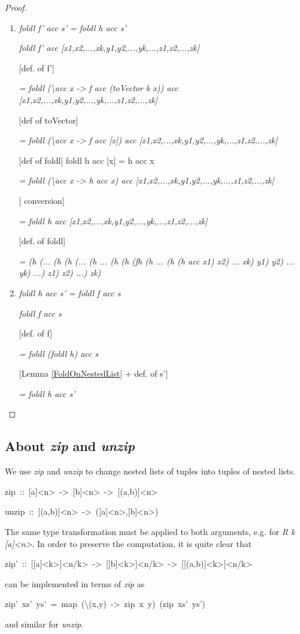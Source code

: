 \documentclass{article}
\newenvironment{lyxcode}
{\par\begin{list}{}{
\setlength{\rightmargin}{\leftmargin}
\setlength{\listparindent}{0pt}\raggedright
\setlength{\itemsep}{0pt}
\setlength{\parsep}{0pt}
\normalfont\ttfamily}\item[]}
{\end{list}}
\begin{document}
\begin{proof}

~
\begin{enumerate}
\item \emph{foldl f' acc s' = foldl h acc s'}


\emph{foldl f' acc {[}x1,x2,...,xk,y1,y2,...,yk,...,z1,z2,...,zk{]}}


{[}def. of f'{]}


\emph{= foldl (\textbackslash{}acc x -> f acc (toVector k x)) acc
{[}x1,x2,...,xk,y1,y2,...,yk,...,z1,z2,...,zk{]}}


{[}def of toVector{]}


\emph{= foldl (\textbackslash{}acc x -> f acc {[}x{]}) acc {[}x1,x2,...,xk,y1,y2,...,yk,...,z1,z2,...,zk{]}}


{[}def of foldl{]} foldl h acc {[}x{]} = h acc x


\emph{= foldl (\textbackslash{}acc x -> h acc x) acc {[}x1,x2,...,xk,y1,y2,...,yk,...,z1,z2,...,zk{]}}


{[} conversion{]} 


\emph{= foldl h acc {[}x1,x2,...,xk,y1,y2,...,yk,...,z1,z2,...,zk{]}}


{[}def. of foldl{]}


\emph{= (h (... (h (h (... (h ... (h (h (fh (h ... (h (h acc x1) x2)
... xk) y1) y2) ... yk) ...) z1) z2) ...) zk)}

\item \emph{foldl h acc s' = foldl f acc s}


\emph{foldl f acc s}


{[}def. of f{]}


\emph{= foldl (foldl h) acc s}


{[}Lemma \ref{FoldOnNestedList} + def. of s'{]}


\emph{= foldl h acc s'}

\end{enumerate}
\end{proof}


\subsection{About \emph{zip} and \emph{unzip} }



We use \emph{zip} and \emph{unzip} to change nested lists of tuples
into tuples of nested lists. 
\begin{lyxcode}
zip~::~{[}a{]}<n>~->~{[}b{]}<n>~->~{[}(a,b){]}<n>

unzip~::~{[}(a,b){]}<n>~->~({[}a{]}<n>,{[}b{]}<n>)
\end{lyxcode}
The same type transformation must be applied to both arguments, e.g.
for \emph{R k {[}a{]}<n>}. In order to preserve the computation, it
is quite clear that
\begin{lyxcode}
zip'~::~{[}{[}a{]}<k>{]}<n/k>~->~{[}{[}b{]}<k>{]}<n/k>~->~{[}{[}(a,b){]}<k>{]}<n/k>
\end{lyxcode}
can be implemented in terms of \emph{zip} as
\begin{lyxcode}
zip'~xs'~ys'~=~map~(\textbackslash{}(x,y)~->~zip~x~y)~(zip~xs'~ys')
\end{lyxcode}
and similar for \emph{unzip}.
\end{document}
